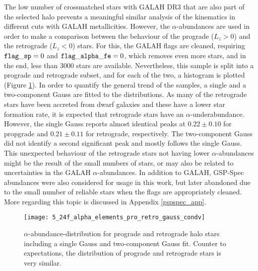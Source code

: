 \documentclass[a4paper,11pt]{article}
\begin{document}
The low number of crossmatched stars with GALAH DR3 that are also part of the selected halo prevents a meaningful similar analysis of the kinematics in different cuts with GALAH metallicities. However, the $\alpha$-abundances are used in order to make a comparison between the behaviour of the prograde ($L_z>0$) and the retrograde ($L_z<0$) stars. For this, the GALAH flags are cleaned, requiring ${\tt flag\_sp}=0$ and ${\tt flag\_alpha\_fe}=0$, which removes even more stars, and in the end, less than 3000 stars are available. Nevertheless, this sample is split into a prograde and retrograde subset, and for each of the two, a histogram is plotted (Figure \ref{fig:alphafe_pro_retro}). In order to quantify the general trend of the samples, a single and a two-component Gauss are fitted to the distributions. As many of the retrograde stars have been accreted from dwarf galaxies and these have a lower star formation rate, it is expected that retrograde stars have an $\alpha$-underabundance. However, the single Gauss reports almost identical peaks at $0.22\pm0.10$ for propgrade and $0.21\pm0.11$ for retrograde, respectively. The two-component Gauss did not identify a second significant peak and mostly follows the single Gauss. This unexpected behaviour of the retrograde stars not having lower $\alpha$-abundances might be the result of the small numbers of stars, or may also be related to uncertainties in the GALAH $\alpha$-abundances. In addition to GALAH, GSP-Spec abundances were also considered for usage in this work, but later abandoned due to the small number of reliable stars when the flags are appropriately cleaned. More regarding this topic is discussed in Appendix \ref{gspspec_app}.
%
\begin{figure}[ht]
 \centering
 \texttt{[image: 5\_24f\_alpha\_elements\_pro\_retro\_gauss\_condv]}
 \caption[$\alpha$-abundance-distribution for prograde and retrograde stars]{$\alpha$-abundance-distribution for prograde and retrograde halo stars including a single Gauss and two-component Gauss fit. Counter to expectations, the distribution of prograde and retrograde stars is very similar.}
 \label{fig:alphafe_pro_retro}
\end{figure}
%
\end{document}
